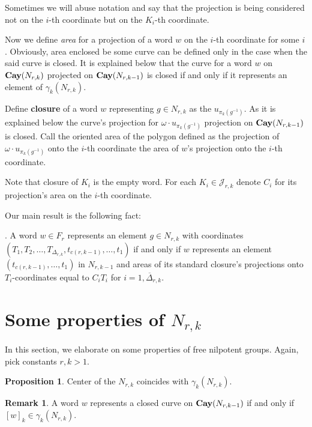 \documentclass[11pt]{amsart}
\theoremstyle{plain}
\theoremstyle{definition}
\newtheorem{Proposition}[Theorem]{Proposition}
\newtheorem{Remark}[Theorem]{Remark}
\numberwithin{equation}{section}
\newcommand{\Cay}{\text{\bf Cay}}
\newcommand{\N}{N_{r,k}}
\newcommand{\JJ}{\mathcal{J}_{r,k}}
\newcommand{\Nrk}{N_{r,k}}
\begin{document}
Sometimes we will abuse notation and say that the projection is being considered not on the $i$-th coordinate but on the $K_i$-th coordinate.


Now we define {\it area} for a projection of a word $w$ on the $i$-th coordinate for some $i$. Obviously, area enclosed be some curve can be defined only in the case when the said curve is closed. It is explained below that the curve for a word $w$ on $\Cay(\N)$ projected on $\Cay(N_{r,k-1})$ is closed if and only if it represents an element of $\gamma_k(\N)$. 

Define {\bf closure} of a word $w$ representing $g \in \N$ as the $u_{\pi_k(g^{-1})}$. As it is explained below the curve's projection for $\omega\cdot u_{\pi_k(g^{-1})}$ projection on $\Cay(N_{r,k-1})$ is closed. Call the oriented area of the polygon defined as the projection of $\omega\cdot u_{\pi_k(g^{-1})}$ onto the $i$-th coordinate the area of $w$'s projection onto the $i$-th coordinate.

Note that closure of $K_i$ is the empty word. For each $K_i \in \JJ$ denote $C_i$ for its projection's area on the $i$-th coordinate.





Our main result is the following fact: 

\begin{spacing}{1.5}
\end{spacing}

.
A word $w \in F_r$ represents an element $g\in \Nrk$ with coordinates $(T_1,T_2,\ldots,T_{\Delta_{r,k}},t_{c(r,k-1)},\ldots,t_1)$ if and only if $w$ represents an element $(t_{c(r,k-1)},\ldots,t_1)$ in $N_{r,k-1}$ and areas of its standard closure's projections onto $T_i$-coordinates equal to $C_iT_i$ for $i = \overline{1,\Delta_{r,k}}.$
\begin{spacing}{1.5}
\end{spacing}

 \section{Some properties of $\N$}
 In this section, we elaborate on some properties of free nilpotent groups. Again, pick constants $r,k>1$.
 \begin{Proposition}
 Center of the $\N$ coincides with $\gamma_k(\N)$.
 \end{Proposition}
 
\begin{Remark}\label{closed}
A word $w$ represents a closed curve on $\Cay(N_{r,k-1})$ if and only if $[w]_k \in \gamma_k(\N)$.
\end{Remark}
\end{document}
